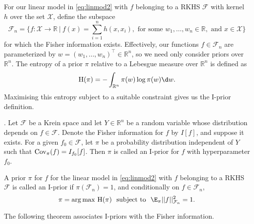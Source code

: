 For our linear model in \eqref{eq:linmod2} with $f$ belonging to a RKHS $\mathcal F$ with kernel $h$ over the set $\mathcal X$, define the subspace
\[
	\mathcal F_n = \Bigg\{f:\mathcal X \rightarrow \mathbb R \ \Bigg|\ f(x)=\sum_{i=1}^n h(x,x_i), \text{ for some } w_1, \dots, w_n \in \mathbb R, \text{ and } x \in \mathcal X\Bigg\}
\]
for which the Fisher information exists. Effectively, our functions $f \in \mathcal F_n$ are parameterized by $w=(w_1, \dots, w_n)^\top \in \mathbb R^n$, so we need only consider priors over $\mathbb R^n$. The entropy of a prior $\pi$ relative to a Lebesgue measure over $\mathbb R^n$ is defined as
\[
	\text{H}(\pi) = -\int_{\mathbb R^n} \pi(w)\log \pi(w) \d w.
\]
Maximising this entropy subject to a suitable constraint gives us the I-prior definition.

\begin{definition}[I-prior] {.}
Let $\mathcal{F}$ be a Krein space and let $Y \in \mathbb{R}^n$ be a random variable whose distribution depends on $f \in \mathcal{F}$. Denote the Fisher information for $f$ by $I[f]$, and suppose it exists. For a given $f_0 \in \mathcal{F}$, let $\pi$ be a probability distribution independent of $Y$ such that $\text{\normalfont Cov}_\pi(f) = I_{f_0}[f]$. Then $\pi$ is called an I-prior for $f$ with hyperparameter $f_0$.
\end{definition}

\begin{definition}[I-prior]
A prior $\pi$ for $f$ for the linear model in \eqref{eq:linmod2} with $f$ belonging to a RKHS $\mathcal F$ is called an I-prior if $\pi(\mathcal F_n) = 1$, and conditionally on $f \in \mathcal F_n$,
\[
	\pi = \arg\max \, \text{H}(\pi) \ \text{ subject to } \ \E_\pi ||f||_{\mathcal F_n}^2 = 1.
\]
\end{definition}

The following theorem associates I-priors with the Fisher information.

